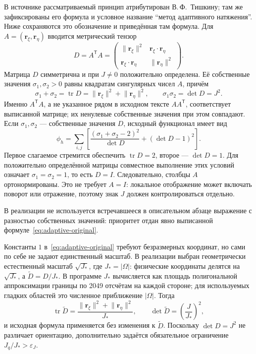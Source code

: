 \documentclass[11pt,a4paper]{article}
\newcommand{\vect}[1]{\boldsymbol{#1}}
\DeclareMathOperator{\tr}{tr}
\begin{document}
В источнике \cite{khalilov2024} рассматриваемый принцип атрибутирован
В.\,Ф.~Тишкину; там же зафиксированы его формула и условное название
``метод адаптивного натяжения''. Ниже сохраняются это обозначение и
приведённая там формула. Для
\(A=(\vect r_\xi,\vect r_\eta)\) вводится метрический тензор
\begin{equation}
D=A^{\mathsf T}A=
\begin{pmatrix}
\lVert\vect r_\xi\rVert^2&
\vect r_\xi\cdot\vect r_\eta\\
\vect r_\xi\cdot\vect r_\eta&
\lVert\vect r_\eta\rVert^2
\end{pmatrix}.
\label{eq:metric}
\end{equation}
Матрица \(D\) симметрична и при \(J\ne0\) положительно определена. Её
собственные значения \(\sigma_1,\sigma_2>0\) равны квадратам сингулярных
чисел \(A\), причём
\begin{equation}
\sigma_1+\sigma_2=\tr D
=\lVert\vect r_\xi\rVert^2+\lVert\vect r_\eta\rVert^2,
\qquad
\sigma_1\sigma_2=\det D=J^2.
\label{eq:metric-invariants}
\end{equation}
Именно \(A^{\mathsf T}A\), а не указанное рядом в исходном тексте
\(AA^{\mathsf T}\), соответствует выписанной матрице; их ненулевые
собственные значения при этом совпадают. Если \(\sigma_1,\sigma_2\) ---
собственные значения \(D\), исходный функционал имеет вид
\begin{equation}
\phi_h=\sum_{i,j}
\left[
\frac{(\sigma_1+\sigma_2-2)^2}{\det D}
+(\det D-1)^2
\right].
\label{eq:adaptive-original}
\end{equation}
Первое слагаемое стремится обеспечить \(\tr D=2\), второе ---
\(\det D=1\). Для положительно определённой матрицы совместное выполнение
этих условий означает \(\sigma_1=\sigma_2=1\), то есть \(D=I\).
Следовательно, столбцы \(A\) ортонормированы. Это не требует
\(A=I\): локальное отображение может включать поворот или отражение,
поэтому знак \(J\) должен контролироваться отдельно.

В реализации не используется встречавшееся в описательном абзаце
выражение с разностью собственных значений: приоритет отдан явно
выписанной формуле~\eqref{eq:adaptive-original}.

Константы \(1\) в~\eqref{eq:adaptive-original} требуют безразмерных
координат, но сами по себе не задают единственный масштаб. В реализации
выбран геометрически естественный масштаб \(\sqrt{J_*}\), где
\(J_*=|\Omega|\): физические координаты делятся на \(\sqrt{J_*}\), а
\(\widetilde D=D/J_*\). В программе \(J_*\) вычисляется как площадь
полигональной аппроксимации границы по 2049 отсчётам на каждой стороне;
для используемых гладких областей это численное приближение
\(|\Omega|\). Тогда
\[
\tr\widetilde D=\frac{\lVert\vect r_\xi\rVert^2+
\lVert\vect r_\eta\rVert^2}{J_*},
\qquad
\det\widetilde D=\left(\frac{J}{J_*}\right)^2,
\]
и исходная формула применяется без изменения к \(\widetilde D\).
Поскольку \(\det D=J^2\) не различает ориентацию, дополнительно задаётся
обязательное ограничение \(J_q/J_*>\varepsilon_J\).
\end{document}
